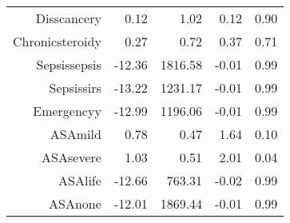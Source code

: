 \begin{tabular}{rrrrr}
$$  Diss\-cancer\-y & 0.12 & 1.02 & 0.12 & 0.90 \\ 
  Chronic\-steroid\-y & 0.27 & 0.72 & 0.37 & 0.71 \\ 
  Sepsis\-sepsis & -12.36 & 1816.58 & -0.01 & 0.99 \\ 
  Sepsis\-sirs & -13.22 & 1231.17 & -0.01 & 0.99 \\ 
  Emergency\-y & -12.99 & 1196.06 & -0.01 & 0.99 \\ 
  ASA\-mild & 0.78 & 0.47 & 1.64 & 0.10 \\ 
  ASA\-severe & 1.03 & 0.51 & 2.01 & 0.04 \\ 
  ASA\-life & -12.66 & 763.31 & -0.02 & 0.99 \\ 
  ASA\-none & -12.01 & 1869.44 & -0.01 & 0.99 \\ 
   \hline
\end{tabular}

